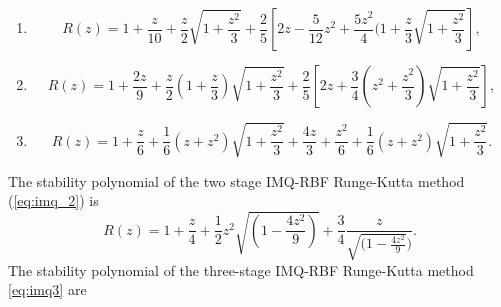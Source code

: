 \documentclass[a4paper, preprint,11pt]{elsarticle}
\numberwithin{equation}{section}
\begin{document}
\begin{enumerate} [label=\Roman*.]
    \item 
    \begin{equation*}
        R(z) = 1 + \frac{z}{10} + \frac{z}{2}\sqrt{1 + \frac{z^2}{3}} + \frac{2}{5}\left[2z -\frac{5}{12}z^2 + \frac{5z^2}{4}(1 + \frac{z}{3}\sqrt{1 + \frac{z^2}{3}} \right],
    \end{equation*}
    \item 
    \begin{equation*}
        R(z) = 1 + \frac{2z}{9} + \frac{z}{2}(1 + \frac{z}{3})\sqrt{1 + \frac{z^2}{3}} + \frac{2}{5}\left[2z + \frac{3}{4}(z^2 + \frac{z^2}{3})\sqrt{1 + \frac{z^2}{3}} \right],
    \end{equation*}
    \item 
    \begin{equation*}
        R(z) = 1 + \frac{z}{6} + \frac{1}{6}(z + z^2)\sqrt{1 + \frac{z^2}{3}} + \frac{4z}{3} + \frac{z^2}{6} + \frac{1}{6}(z +z^2)\sqrt{1 + \frac{z^2}{3}} .
    \end{equation*}
\end{enumerate}
\noindent The stability polynomial of the two stage IMQ-RBF Runge-Kutta method (\ref{eq:imq_2}) is 
\begin{equation*}
    R(z) = 1 + \frac{z}{4} + \frac{1}{2} z^2  \sqrt{(1 - \frac{4 z^2}{9})} + \frac{3}{4}\dfrac{z}{\sqrt{(1 - \frac{4 z^2}{9}})}.
\end{equation*}
The stability polynomial of the three-stage IMQ-RBF Runge-Kutta method \eqref{eq:imq3} are
\end{document}
